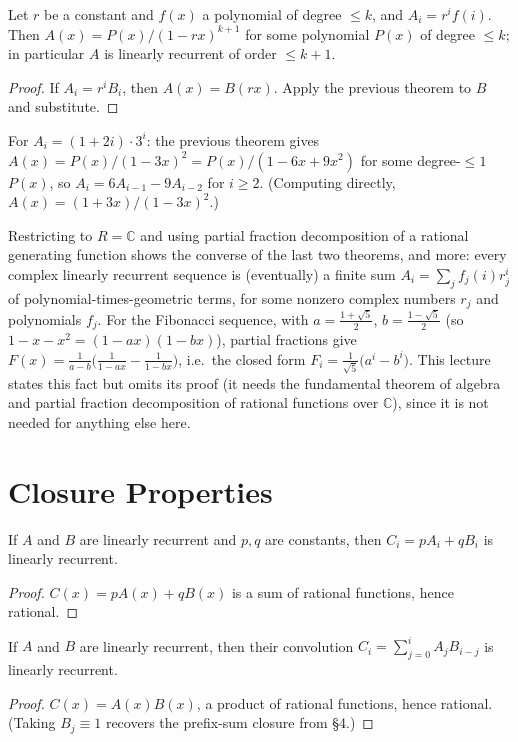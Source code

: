 \documentclass[11pt]{article}
\begin{document}
\begin{theorembox}
Let $r$ be a constant and $f(x)$ a polynomial of degree $\le k$, and
$A_i = r^if(i)$. Then $A(x)=P(x)/(1-rx)^{k+1}$ for some polynomial
$P(x)$ of degree $\le k$; in particular $A$ is linearly recurrent of
order $\le k+1$.
\end{theorembox}
\begin{proof}
If $A_i=r^iB_i$, then $A(x)=B(rx)$. Apply the previous theorem to $B$
and substitute.
\end{proof}

\begin{examplebox}
For $A_i=(1+2i)\cdot 3^i$: the previous theorem gives
$A(x) = P(x)/(1-3x)^2 = P(x)/(1-6x+9x^2)$ for some degree-$\le 1$
$P(x)$, so $A_i = 6A_{i-1}-9A_{i-2}$ for $i\ge 2$. (Computing directly,
$A(x) = (1+3x)/(1-3x)^2$.)
\end{examplebox}

\begin{notebox}
Restricting to $R=\mathbb{C}$ and using partial fraction decomposition
of a rational generating function shows the converse of the last two
theorems, and more: every complex linearly recurrent sequence is
(eventually) a finite sum $A_i = \sum_j f_j(i)r_j^i$ of
polynomial-times-geometric terms, for some nonzero complex numbers $r_j$
and polynomials $f_j$. For the Fibonacci sequence, with
$a=\tfrac{1+\sqrt5}{2}$, $b=\tfrac{1-\sqrt5}{2}$ (so
$1-x-x^2=(1-ax)(1-bx)$), partial fractions give
$F(x) = \tfrac{1}{a-b}\bigl(\tfrac{1}{1-ax}-\tfrac{1}{1-bx}\bigr)$, i.e.\
the closed form
$F_i = \tfrac{1}{\sqrt5}\bigl(a^i - b^i\bigr)$. This lecture states this
fact but omits its proof (it needs the fundamental theorem of algebra
and partial fraction decomposition of rational functions over
$\mathbb{C}$), since it is not needed for anything else here.
\end{notebox}

\section{Closure Properties}
\begin{theorembox}
If $A$ and $B$ are linearly recurrent and $p,q$ are constants, then
$C_i=pA_i+qB_i$ is linearly recurrent.
\end{theorembox}
\begin{proof}
$C(x) = pA(x)+qB(x)$ is a sum of rational functions, hence rational.
\end{proof}

\begin{theorembox}
If $A$ and $B$ are linearly recurrent, then their convolution
$C_i = \sum_{j=0}^i A_jB_{i-j}$ is linearly recurrent.
\end{theorembox}
\begin{proof}
$C(x) = A(x)B(x)$, a product of rational functions, hence rational.
(Taking $B_j \equiv 1$ recovers the prefix-sum closure from \S4.)
\end{proof}
\end{document}
